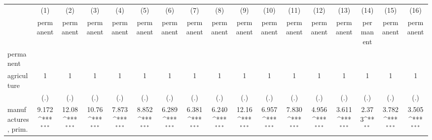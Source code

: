 {
\def\sym#1{\ifmmode^{#1}\else\(^{#1}\)\fi}
\begin{tabular}{l*{16}{c}}
\hline\hline
                    &\multicolumn{1}{c}{(1)}&\multicolumn{1}{c}{(2)}&\multicolumn{1}{c}{(3)}&\multicolumn{1}{c}{(4)}&\multicolumn{1}{c}{(5)}&\multicolumn{1}{c}{(6)}&\multicolumn{1}{c}{(7)}&\multicolumn{1}{c}{(8)}&\multicolumn{1}{c}{(9)}&\multicolumn{1}{c}{(10)}&\multicolumn{1}{c}{(11)}&\multicolumn{1}{c}{(12)}&\multicolumn{1}{c}{(13)}&\multicolumn{1}{c}{(14)}&\multicolumn{1}{c}{(15)}&\multicolumn{1}{c}{(16)}\\
                    &\multicolumn{1}{c}{permanent}&\multicolumn{1}{c}{permanent}&\multicolumn{1}{c}{permanent}&\multicolumn{1}{c}{permanent}&\multicolumn{1}{c}{permanent}&\multicolumn{1}{c}{permanent}&\multicolumn{1}{c}{permanent}&\multicolumn{1}{c}{permanent}&\multicolumn{1}{c}{permanent}&\multicolumn{1}{c}{permanent}&\multicolumn{1}{c}{permanent}&\multicolumn{1}{c}{permanent}&\multicolumn{1}{c}{permanent}&\multicolumn{1}{c}{permanent}&\multicolumn{1}{c}{permanent}&\multicolumn{1}{c}{permanent}\\
\hline
permanent           &                     &                     &                     &                     &                     &                     &                     &                     &                     &                     &                     &                     &                     &                     &                     &                     \\
agriculture         &           1         &           1         &           1         &           1         &           1         &           1         &           1         &           1         &           1         &           1         &           1         &           1         &           1         &           1         &           1         &           1         \\
                    &         (.)         &         (.)         &         (.)         &         (.)         &         (.)         &         (.)         &         (.)         &         (.)         &         (.)         &         (.)         &         (.)         &         (.)         &         (.)         &         (.)         &         (.)         &         (.)         \\
[1em]
manufactures, prim. &       9.172\sym{***}&       12.08\sym{***}&       10.76\sym{***}&       7.873\sym{***}&       8.852\sym{***}&       6.289\sym{***}&       6.381\sym{***}&       6.240\sym{***}&       12.16\sym{***}&       6.957\sym{***}&       7.830\sym{***}&       4.956\sym{***}&       3.611\sym{***}&       2.373\sym{**} &       3.782\sym{***}&       3.505\sym{***}\\

\end{tabular}}
